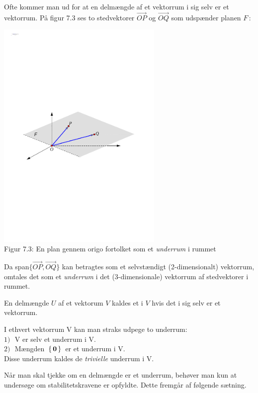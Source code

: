 Ofte kommer man ud for at en delmængde af et vektorrum i sig selv er et vektorrum. På figur 7.3 ses to stedvektorer $\stackrel{\rightarrow}{OP}$ og $\stackrel{\rightarrow}{OQ}$ som udspænder planen $F\,$: 

\begin{center}
		\includegraphics[trim=2cm 10cm 2cm
 10cm,width=0.60\textwidth,clip]{span.pdf}
  \\Figur 7.3: En plan gennem origo fortolket som et \textit{underrum} i rummet		
\end{center}
Da span$\{\stackrel{\rightarrow}{OP},\stackrel{\rightarrow}{OQ}\}$ kan betragtes som et selvstændigt (2-dimensionalt) vektorrum, omtales det som et \textit{underrum} i det (3-dimensionale) vektorrum af stedvektorer i rummet.

\begin{definition}[Underrum]\label{tn7.defUrum}
En delmængde $U$ af et vektorum $V$ kaldes et  i $V$ hvis det i sig selv er et vektorrum.
\end{definition}
\begin{aha}
I ethvert vektorrum V kan man straks udpege to underrum:\\
$1)\,\,$ V er selv et underrum i V.\\
$2)\,\,$ Mængden $\,\left\{\,\bm{0}\,\right\}\,$ er et underrum i V.\\
Disse underrum kaldes de \textit{trivielle} underrum i V. 
\end{aha}
Når man skal tjekke om en delmængde er et underrum, behøver man kun at undersøge om stabilitetskravene er opfyldte. Dette fremgår af følgende sætning.

